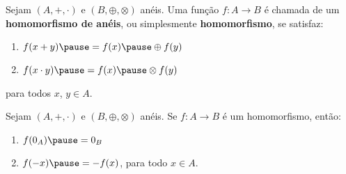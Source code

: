 \documentclass{beamer}
\begin{document}
    \begin{frame}
        \begin{definicao}
            Sejam $(A, +, \cdot)$ \pause e $(B, \oplus, \otimes)$ \pause an\'eis. \pause Uma fun{\c c}{\~a}o $f : A \to B$ \pause \'e chamada de um \textbf{homomorfismo de an\'eis}, \pause ou simplesmente \textbf{homomorfismo}, \pause se satisfaz:\pause
            \begin{enumerate}[label={\roman*})]
                \item $f(x + y) \pause = f(x) \pause \oplus f(y)$\pause

                \vspace{.5cm}

                \item $f(x \cdot y) \pause = f(x) \pause \otimes f(y)$\pause

                \vspace{.5cm}
            \end{enumerate}
            para todos $x$, $y \in A$.\pause
        \end{definicao}
    \end{frame}

    \begin{frame}
        \begin{proposicao}
            Sejam $(A, +, \cdot)$ e $(B, \oplus, \otimes)$ an\'eis. \pause Se $f : A \to B$ \'e um homomorfismo, \pause ent{\~a}o:\pause
            \begin{enumerate}[label={\roman*})]
                \item $f(0_{A}) \pause = 0_{B}$\pause

                \vspace{.5cm}

                \item $f(-x) \pause = -f(x)$, \pause para todo $x \in A$.\pause
            \end{enumerate}
        \end{proposicao}
    \end{frame}
\end{document}
